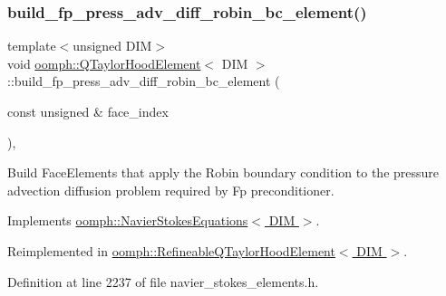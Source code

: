 \subsubsection{\texorpdfstring{build\+\_\+fp\+\_\+press\+\_\+adv\+\_\+diff\+\_\+robin\+\_\+bc\+\_\+element()}{build\_fp\_press\_adv\_diff\_robin\_bc\_element()}}
{\footnotesize\ttfamily template$<$unsigned D\+IM$>$ \\
void \hyperlink{classoomph_1_1QTaylorHoodElement}{oomph\+::\+Q\+Taylor\+Hood\+Element}$<$ D\+IM $>$\+::build\+\_\+fp\+\_\+press\+\_\+adv\+\_\+diff\+\_\+robin\+\_\+bc\+\_\+element (\begin{DoxyParamCaption}\item[{const unsigned \&}]{face\+\_\+index }\end{DoxyParamCaption})\hspace{0.3cm}{\ttfamily [inline]}, {\ttfamily [virtual]}}



Build Face\+Elements that apply the Robin boundary condition to the pressure advection diffusion problem required by Fp preconditioner. 



Implements \hyperlink{classoomph_1_1NavierStokesEquations_a16bfab3df70ad2204217590c0e3b7de1}{oomph\+::\+Navier\+Stokes\+Equations$<$ D\+I\+M $>$}.



Reimplemented in \hyperlink{classoomph_1_1RefineableQTaylorHoodElement_ab7f69a90be6e5129d2dbf294e01642af}{oomph\+::\+Refineable\+Q\+Taylor\+Hood\+Element$<$ D\+I\+M $>$}.



Definition at line 2237 of file navier\+\_\+stokes\+\_\+elements.\+h.

\mbox{\label{classoomph_1_1QTaylorHoodElement_a361d8f56918429731de4929a75310f26}} 
